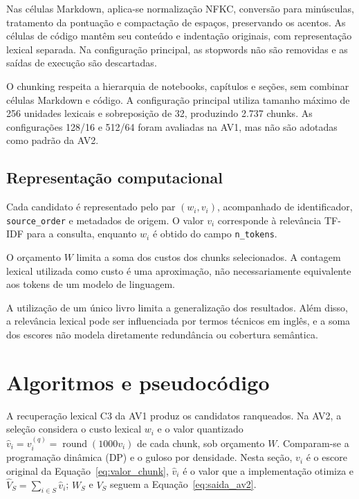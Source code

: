 \documentclass[11pt,a4paper]{article}
\theoremstyle{plain}
\theoremstyle{definition}
\theoremstyle{plain}
\begin{document}
Nas células Markdown, aplica-se normalização
NFKC, conversão para minúsculas, tratamento
da pontuação e compactação de espaços,
preservando os acentos. As células de código
mantêm seu conteúdo e indentação originais,
com representação lexical separada.
Na configuração principal, as stopwords
não são removidas e as saídas de execução
são descartadas.

O chunking respeita a hierarquia de notebooks,
capítulos e seções, sem combinar células
Markdown e código. A configuração principal
utiliza tamanho máximo de 256 unidades
lexicais e sobreposição de 32, produzindo
2.737 chunks. As configurações 128/16 e
512/64 foram avaliadas na AV1, mas não
são adotadas como padrão da AV2.

\subsection{Representação computacional}

Cada candidato é representado pelo par
$(w_i,v_i)$, acompanhado de identificador,
\texttt{source\_order} e metadados de origem.
O valor $v_i$ corresponde à relevância TF-IDF
para a consulta, enquanto $w_i$ é obtido
do campo \texttt{n\_tokens}.

O orçamento $W$ limita a soma dos custos
dos chunks selecionados. A contagem lexical
utilizada como custo é uma aproximação,
não necessariamente equivalente aos tokens
de um modelo de linguagem.

A utilização de um único livro limita a
generalização dos resultados. Além disso,
a relevância lexical pode ser influenciada
por termos técnicos em inglês, e a soma
dos escores não modela diretamente
redundância ou cobertura semântica.



\section{Algoritmos e pseudocódigo}
\label{sec:algoritmos}

A recuperação lexical C3 da AV1 produz os candidatos ranqueados. Na AV2, a seleção
considera o custo lexical $w_i$ e o valor quantizado
$\hat{v}_i=v_i^{(q)}=\operatorname{round}(1000v_i)$ de cada chunk, sob orçamento $W$.
Comparam-se a programação dinâmica (DP) e o guloso por densidade. Nesta seção, $v_i$ é o
escore original da Equação~\eqref{eq:valor_chunk}, $\hat{v}_i$ é o valor que a
implementação otimiza e $\hat{V}_S=\sum_{i\in S}\hat{v}_i$; $W_S$ e $V_S$ seguem a
Equação~\eqref{eq:saida_av2}.
\end{document}
